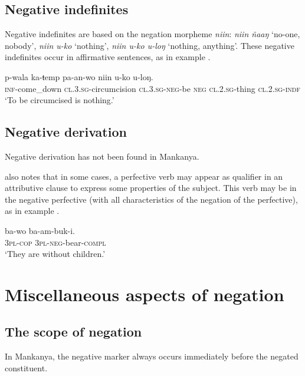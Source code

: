 \documentclass[output=paper,colorlinks,citecolor=brown]{langscibook}
\begin{document}
\subsection{Negative indefinites}\label{sec:mank:3.2}

Negative indefinites are based on the negation morpheme \textit{niin}: \textit{niin ñaaŋ} ‘no-one, nobody’, \textit{niin u-ko} ‘nothing’, \textit{niin u-ko u-loŋ} ‘nothing, anything’. These negative indefinites occur in affirmative sentences, as in example .

\ea\label{ex:mank:59}
    \gll p-wala ka-ŧemp pa-an-wo niin u-ko u-loŋ. \\
         \textsc{inf}{}-come\_down \textsc{cl.3.sg}{}-circumcision \textsc{cl.3.sg{}-neg}{}-be \textsc{neg} \textsc{cl.2.sg}{}-thing \textsc{cl.2.sg}{}-\textsc{indf}\\
    \glt ‘To be circumcised is nothing.’ \citep[142]{Gaved2020}
\z


\subsection{Negative derivation}\label{sec:mank:3.3}

Negative derivation has not been found in Mankanya.

\citet[12]{Gaved2007} also notes that in some cases, a perfective verb may appear as qualifier in an attributive clause to express some properties of the subject. This verb may be in the negative perfective (with all characteristics of the negation of the perfective), as in example . 

\ea\label{ex:mank:60}
    \gll ba-wo ba-am-buk-i.\\
         \textsc{3pl-cop} \textsc{3pl{}-neg}-bear-\textsc{compl}\\
    \glt ‘They are without children.’ \citep[12]{Gaved2007}
\z

\section{Miscellaneous aspects of negation}\label{sec:mank:4}
\subsection{The scope of negation}\label{sec:mank:4.1}

In Mankanya, the negative marker always occurs immediately before the negated constituent.
\end{document}
